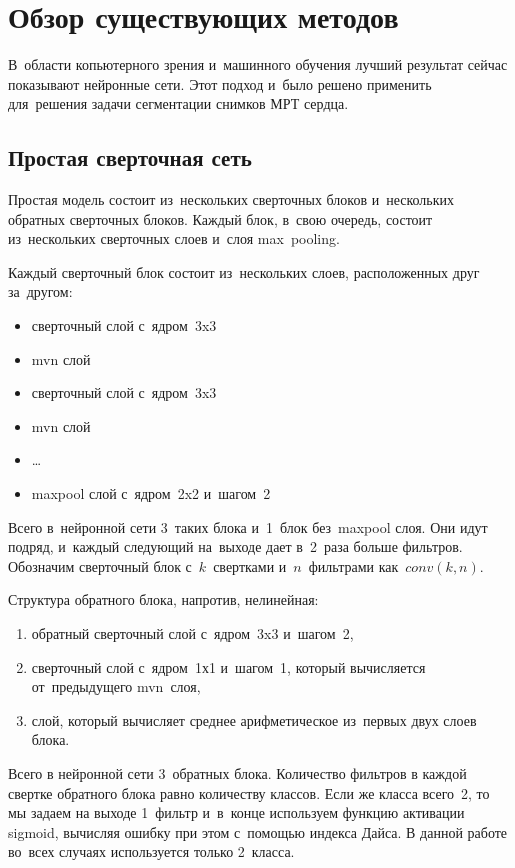 \section{Обзор существующих методов}

В~области копьютерного зрения и~машинного обучения лучший результат сейчас показывают нейронные сети. Этот подход и~было решено применить для~решения задачи сегментации снимков МРТ сердца.

\subsection{Простая сверточная сеть}
 
Простая модель состоит из~нескольких сверточных блоков и~нескольких обратных сверточных блоков. Каждый блок, в~свою очередь, состоит из~нескольких сверточных слоев и~слоя max~pooling. 

Каждый сверточный блок состоит из~нескольких слоев, расположенных друг за~другом:

\begin{itemize}
  \item сверточный слой с~ядром~3x3
  \item mvn слой
  \item сверточный слой с~ядром~3x3
  \item mvn слой
  \item \dots
  \item maxpool слой с~ядром~2x2 и~шагом~2
\end{itemize}

Всего в~нейронной сети 3~таких блока и~1~блок без~maxpool слоя. Они идут подряд, и~каждый следующий на~выходе дает в~2~раза больше фильтров. Обозначим сверточный блок с~$k$~свертками и~$n$~фильтрами как~$conv(k,n)$.

Структура обратного блока, напротив, нелинейная:

\begin{enumerate}
	\item обратный сверточный слой с~ядром~3x3 и~шагом~2,
	\item сверточный слой с~ядром~1х1 и~шагом~1, который вычисляется от~предыдущего mvn~слоя,
	\item слой, который вычисляет среднее арифметическое из~первых двух слоев блока.
\end{enumerate}

Всего в нейронной сети 3~обратных блока. Количество фильтров в каждой свертке обратного блока равно количеству классов. Если же класса всего~2, то мы задаем на выходе 1~фильтр и~в~конце используем функцию активации sigmoid, вычисляя ошибку при этом с~помощью индекса Дайса. В данной работе во~всех случаях используется только 2~класса.

